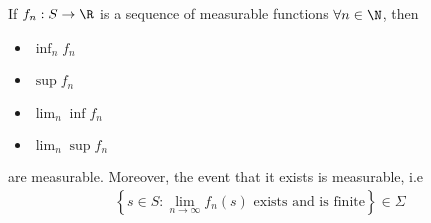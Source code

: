 \par\bigskip
\begin{lem}[]{}
  If $f_n:S\to\R$ is a sequence of measurable functions $\forall n\in\N$, then\par
  \begin{itemize}
    \item $\inf_n f_n$
    \item $\sup f_n$
    \item $\lim_{n}\inf f_n$
    \item $\lim_{n}\sup f_n$
  \end{itemize}\par
  \noindent are measurable. Moreover, the event that it exists is measurable, i.e
  \begin{equation*}
    \begin{gathered}
      \left\{s\in S:\lim_{n\to\infty}f_n(s)\text{ exists and is finite}\right\}\in\Sigma
    \end{gathered}
  \end{equation*}
\end{lem}
\newpage
